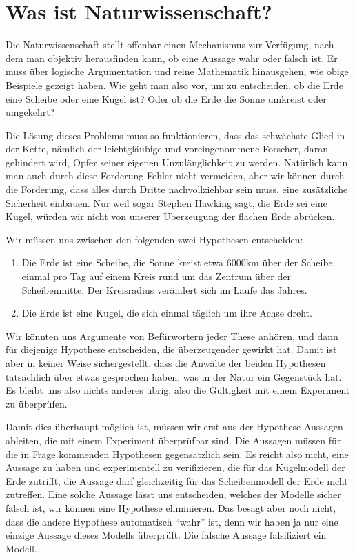 \section*{Was ist Naturwissenschaft?}
Die Naturwissenschaft stellt offenbar einen Mechanismus zur Verfügung,
nach dem man objektiv herausfinden kann, ob eine Aussage wahr oder falsch ist.
Er muss über logische Argumentation und reine Mathematik hinausgehen,
wie obige Beispiele gezeigt haben.
Wie geht man also vor, um zu entscheiden, ob die Erde eine Scheibe
oder eine Kugel ist?
Oder ob die Erde die Sonne umkreist oder umgekehrt?

Die Lösung dieses Problems muss so funktionieren, dass das schwächste
Glied in der Kette, nämlich der leichtgläubige und voreingenommene
Forscher, daran gehindert wird, Opfer seiner eigenen Unzulänglichkeit
zu werden.
Natürlich kann man auch durch diese Forderung Fehler nicht vermeiden,
aber wir können durch die Forderung, dass alles durch Dritte nachvollziehbar
sein muss, eine zusätzliche Sicherheit einbauen.
Nur weil sogar Stephen Hawking sagt, die Erde sei eine Kugel, würden wir
nicht von unserer Überzeugung der flachen Erde abrücken.

Wir müssen uns zwischen den folgenden zwei Hypothesen entscheiden:
\begin{enumerate}
\item Die Erde ist eine Scheibe, die Sonne kreist etwa 6000km über der
Scheibe einmal pro Tag auf einem Kreis rund um das Zentrum über der
Scheibenmitte. 
Der Kreisradius verändert sich im Laufe das Jahres.
\item Die Erde ist eine Kugel, die sich einmal täglich um ihre
Achse dreht.
\end{enumerate}
Wir könnten uns Argumente von Befürwortern jeder These anhören,
und dann für diejenige Hypothese entscheiden, die überzeugender
gewirkt hat. 
Damit ist aber in keiner Weise sichergestellt, dass die Anwälte der
beiden Hypothesen tatsächlich über etwas gesprochen haben, was
in der Natur ein Gegenstück hat.
Es bleibt uns also nichts anderes übrig, also die Gültigkeit mit
einem Experiment zu überprüfen.

Damit dies überhaupt möglich ist, müssen wir erst aus der Hypothese
Aussagen ableiten, die mit einem Experiment überprüfbar sind.
Die Aussagen müssen für die in Frage kommenden Hypothesen gegensätzlich
sein.
Es reicht also nicht, eine Aussage zu haben und experimentell zu
verifizieren, die für das Kugelmodell der Erde zutrifft,
die Aussage darf gleichzeitig für das Scheibenmodell der Erde
nicht zutreffen.
Eine solche Aussage lässt uns entscheiden, welches der Modelle
sicher falsch ist, wir können eine Hypothese eliminieren.
Das besagt aber noch nicht, dass die andere Hypothese automatisch
``wahr'' ist, denn wir haben ja nur eine einzige Aussage dieses
Modells überprüft.
Die falsche Aussage falsifiziert ein Modell.

